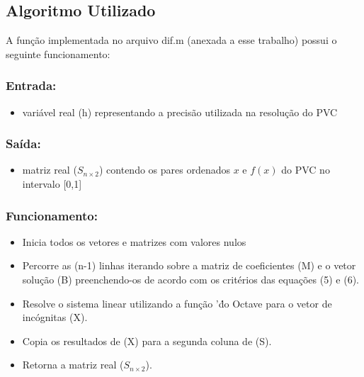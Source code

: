 \documentclass{coursepaper}
\begin{document}
        \subsection{Algoritmo Utilizado}
            A função implementada no arquivo dif.m (anexada a esse trabalho) possui o seguinte funcionamento:\\

            \subsubsection{Entrada:}
            \begin{itemize}
                \item variável real (h) representando a precisão utilizada na resolução do PVC
            \end{itemize}

            \subsubsection{Saída:}
            \begin{itemize}
                \item matriz real ($S_{{n}\times{2}}$) contendo os pares ordenados $x$ e $f(x)$ do PVC no intervalo [0,1]
            \end{itemize}

            \subsubsection{Funcionamento:}
            \begin{itemize}
                \item Inicia todos os vetores e matrizes com valores nulos
                \item Percorre as (n-1) linhas iterando sobre a matriz de coeficientes (M) e o vetor solução (B) preenchendo-os de acordo com os critérios das equações (5) e (6).
                \item Resolve o sistema linear utilizando a função '\' do Octave para o vetor de incógnitas (X).
                \item Copia os resultados de (X) para a segunda coluna de (S).
                \item Retorna a matriz real ($S_{{n}\times{2}}$).
            \end{itemize}
\end{document}

